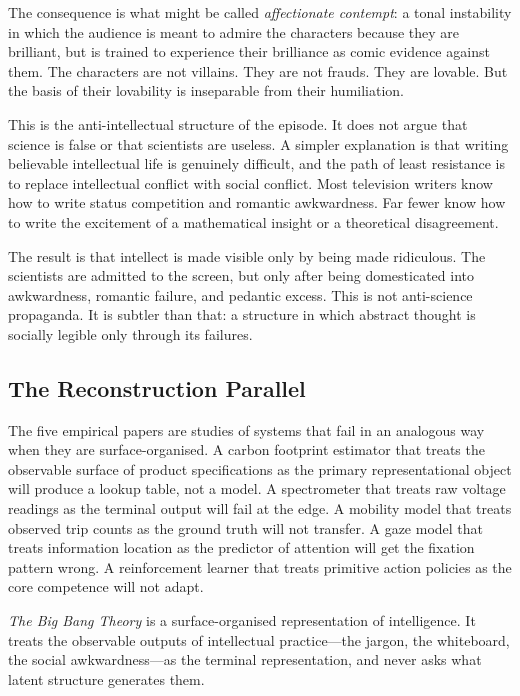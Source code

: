 \documentclass[12pt, letterpaper]{article}
\theoremstyle{remark}
\newcommand{\BBT}{\textit{The Big Bang Theory}}
\begin{document}
The consequence is what might be called \emph{affectionate contempt}: a tonal
instability in which the audience is meant to admire the characters because
they are brilliant, but is trained to experience their brilliance as comic
evidence against them.  The characters are not villains.  They are not frauds.
They are lovable.  But the basis of their lovability is inseparable from their
humiliation.

This is the anti-intellectual structure of the episode.  It does not argue
that science is false or that scientists are useless.  A simpler explanation
is that writing believable intellectual life is genuinely difficult, and the
path of least resistance is to replace intellectual conflict with social
conflict.  Most television writers know how to write status competition and
romantic awkwardness.  Far fewer know how to write the excitement of a
mathematical insight or a theoretical disagreement.

The result is that intellect is made visible only by being made ridiculous.
The scientists are admitted to the screen, but only after being domesticated
into awkwardness, romantic failure, and pedantic excess.  This is not
anti-science propaganda.  It is subtler than that: a structure in which
abstract thought is socially legible only through its failures.

\subsection{The Reconstruction Parallel}

The five empirical papers are studies of systems that fail in an analogous
way when they are surface-organised.  A carbon footprint estimator that
treats the observable surface of product specifications as the primary
representational object will produce a lookup table, not a model.  A
spectrometer that treats raw voltage readings as the terminal output will
fail at the edge.  A mobility model that treats observed trip counts as the
ground truth will not transfer.  A gaze model that treats information location
as the predictor of attention will get the fixation pattern wrong.  A
reinforcement learner that treats primitive action policies as the core
competence will not adapt.

\BBT{} is a surface-organised representation of intelligence.  It treats the
observable outputs of intellectual practice---the jargon, the whiteboard,
the social awkwardness---as the terminal representation, and never asks what
latent structure generates them.
\end{document}
